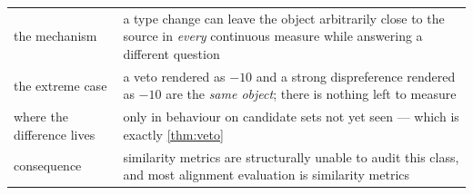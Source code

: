 \begin{table}[H]\centering\small
\begin{tabularx}{\textwidth}{P{3.4cm}Y}
\toprule
the mechanism & a type change can leave the object arbitrarily close to the
source in \emph{every} continuous measure while answering a different question\\
the extreme case & a veto rendered as $-10$ and a strong dispreference rendered as
$-10$ are the \emph{same object}; there is nothing left to measure\\
where the difference lives & only in behaviour on candidate sets not yet seen ---
which is exactly \cref{thm:veto}\\
consequence & similarity metrics are structurally unable to audit this class, and
most alignment evaluation is similarity metrics\\
\bottomrule
\end{tabularx}
\end{table}

